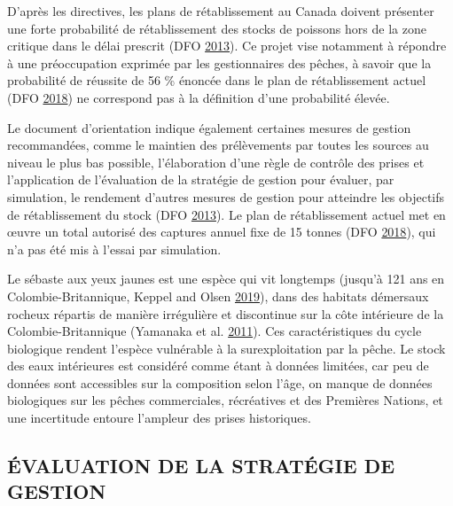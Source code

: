 \documentclass[11pt]{book}
\begin{document}
D'après les directives, les plans de rétablissement au Canada doivent présenter une forte probabilité de rétablissement des stocks de poissons hors de la zone critique dans le délai prescrit (DFO \protect\hyperlink{ref-dfo2013}{2013}). Ce projet vise notamment à répondre à une préoccupation exprimée par les gestionnaires des pêches, à savoir que la probabilité de réussite de 56 \% énoncée dans le plan de rétablissement actuel (DFO \protect\hyperlink{ref-ifmp2018}{2018}) ne correspond pas à la définition d'une probabilité élevée.

Le document d'orientation indique également certaines mesures de gestion recommandées, comme le maintien des prélèvements par toutes les sources au niveau le plus bas possible, l'élaboration d'une règle de contrôle des prises et l'application de l'évaluation de la stratégie de gestion pour évaluer, par simulation, le rendement d'autres mesures de gestion pour atteindre les objectifs de rétablissement du stock (DFO \protect\hyperlink{ref-dfo2013}{2013}). Le plan de rétablissement actuel met en œuvre un total autorisé des captures annuel fixe de 15 tonnes (DFO \protect\hyperlink{ref-ifmp2018}{2018}), qui n'a pas été mis à l'essai par simulation.

Le sébaste aux yeux jaunes est une espèce qui vit longtemps (jusqu'à 121 ans en Colombie-Britannique, Keppel and Olsen \protect\hyperlink{ref-keppel2019}{2019}), dans des habitats démersaux rocheux répartis de manière irrégulière et discontinue sur la côte intérieure de la Colombie-Britannique (Yamanaka et al. \protect\hyperlink{ref-yamanaka2011}{2011}). Ces caractéristiques du cycle biologique rendent l'espèce vulnérable à la surexploitation par la pêche. Le stock des eaux intérieures est considéré comme étant à données limitées, car peu de données sont accessibles sur la composition selon l'âge, on manque de données biologiques sur les pêches commerciales, récréatives et des Premières Nations, et une incertitude entoure l'ampleur des prises historiques.

\hypertarget{sec:introduction-mse}{%
\subsection{ÉVALUATION DE LA STRATÉGIE DE GESTION}\label{sec:introduction-mse}}
\end{document}
